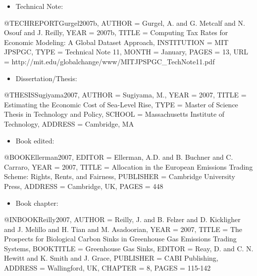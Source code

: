 \documentclass[12pt,fleqn]{article}
\let\oldverbatim\verbatim
\let\oldendverbatim\endverbatim
\renewenvironment{verbatim}{\endgraf\footnotesize\singlespace\oldverbatim}{\oldendverbatim\endsinglespace}
\begin{document}
\begin{itemize}
\item Technical Note:
\end{itemize}
\begin{verbatim}
@TECHREPORT{Gurgel2007b,
  AUTHOR = {Gurgel, A. and G. Metcalf and N. Osouf and J. Reilly},
  YEAR = {2007b},
  TITLE = {Computing Tax Rates for Economic Modeling: A Global Dataset Approach},
  INSTITUTION = {MIT JPSPGC},
  TYPE = {Technical Note 11},
  MONTH = {January},
  PAGES = {13},
  URL = {http://mit.edu/globalchange/www/MITJPSPGC_TechNote11.pdf}}
\end{verbatim}

\begin{itemize}
\item Dissertation/Thesis:
\end{itemize}
\begin{verbatim}
@THESIS{Sugiyama2007,
  AUTHOR = {Sugiyama, M.},
  YEAR = {2007},
  TITLE = {Estimating the Economic Cost of Sea-Level Rise},
  TYPE = {Master of Science Thesis in Technology and Policy},
  SCHOOL = {Massachusetts Institute of Technology},
  ADDRESS = {Cambridge, MA}}
\end{verbatim}

\begin{itemize}
\item Book edited:
\end{itemize}
\begin{verbatim}
@BOOK{Ellerman2007,
  EDITOR = {Ellerman, A.D. and B. Buchner and C. Carraro},
  YEAR = {2007},
  TITLE = {Allocation in the European Emissions Trading Scheme: Rights, Rents,
  and Fairness},
  PUBLISHER = {Cambridge University Press},
  ADDRESS = {Cambridge, UK},
  PAGES = {448}}
\end{verbatim}

\begin{itemize}
\item Book chapter:
\end{itemize}
\begin{verbatim}
@INBOOK{Reilly2007,
  AUTHOR = {Reilly, J. and B. Felzer and D. Kickligher and J. Melillo and H. Tian
  and M. Asadoorian},
  YEAR = {2007},
  TITLE = {The Prospects for Biological Carbon Sinks in Greenhouse Gas Emissions
  Trading Systems},
  BOOKTITLE = {Greenhouse Gas Sinks},
  EDITOR = {Reay, D. and C. N. Hewitt and K. Smith and J. Grace},
  PUBLISHER = {CABI Publishing},
  ADDRESS = {Wallingford, UK},
  CHAPTER = {8},
  PAGES = {115-142}}
\end{verbatim}
\end{document}
